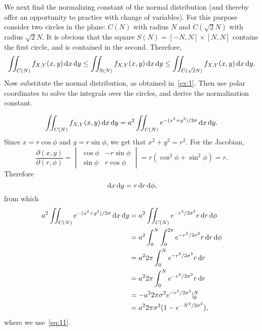 \begin{exercise}
We next find the normalizing constant of the normal distribution (and thereby offer an opportunity to practice with change of variables).
For this purpose consider two circles in the plane: $C(N)$ with radius $N$ and $C(\sqrt 2 N)$ with radius $\sqrt 2 N$.
It is obvious that the square $S(N) = [-N,N]\times[N,N]$ contains the first circle, and is contained in the second.
Therefore,
\begin{equation}
  \label{eq:13}
  \iint_{C(N)}f_{X,Y}(x,y) \,\textrm{d}x\,\textrm{d}y \leq
  \iint_{S(N)}f_{X,Y}(x,y) \,\textrm{d}x\,\textrm{d}y \leq
  \iint_{C(\sqrt 2 N)}f_{X,Y}(x,y) \,\textrm{d}x\,\textrm{d}y.
\end{equation}
Now substitute the normal distribution, as obtained in~\cref{ex:1}. Then use polar coordinates to solve the integrals over the circles, and derive the normalization constant.
\begin{solution}
\begin{equation}
\label{eq:14}
  \iint_{C(N)}f_{X,Y}(x,y) \,\textrm{d}x\,\textrm{d}y =
a^{2}  \iint_{C(N)} e^{-(x^{2}+y^{2})/2\sigma} \,\textrm{d}x\,\textrm{d}y.
\end{equation}
Since  $x = r \cos \phi$ and $y=r\sin \phi$, we get that $x^2+y^2 = r^{2}$. For the Jacobian,
\begin{equation}
  \label{eq:15}
  \frac{\partial(x, y)}{\partial(r,\phi)} =
  \begin{vmatrix}
    \cos \phi  & -r\sin \phi \\
    \sin \phi  & r\cos \phi
  \end{vmatrix}
= r(\cos^{2} \phi + \sin^2 \phi) = r.
\end{equation}
Therefore
\begin{equation}
\label{eq:16}
\,\textrm{d}x \,\textrm{d}y = r \,\textrm{d}r \,\textrm{d}\phi,
\end{equation}
from which
\begin{align}
a^{2}  \iint_{C(N)} e^{-(x^{2}+y^{2})/2\sigma} \,\textrm{d}x\,\textrm{d}y
&=a^{2}  \iint_{C(N)} e^{-r^{2}/2\sigma^{2}} r \,\textrm{d}r\,\textrm{d}\phi \\
&= a^{2}  \int_{0}^{N} \int_{0}^{2\pi} e^{-r^{2}/2\sigma^{2}} r \,\textrm{d}r\,\textrm{d}\phi \\
&= a^{2}  2\pi \int_{0}^{N}  e^{-r^{2}/2\sigma^{2}} r \,\textrm{d}r \\
&= a^{2}  2\pi \int_{0}^{N}  e^{-r^{2}/2\sigma^{2}} r \,\textrm{d}r \\
&= - a^{2}  2\pi{\sigma^{2}} e^{-r^{2}/2\sigma^{2}}|_{0}^{N} \\
&= a^{2}2\pi{\sigma^{2}} (1-e^{-N^{2}/2\sigma^{2}}),
\end{align}
where we use~\cref{eq:11}.

\end{solution}
\end{exercise}

